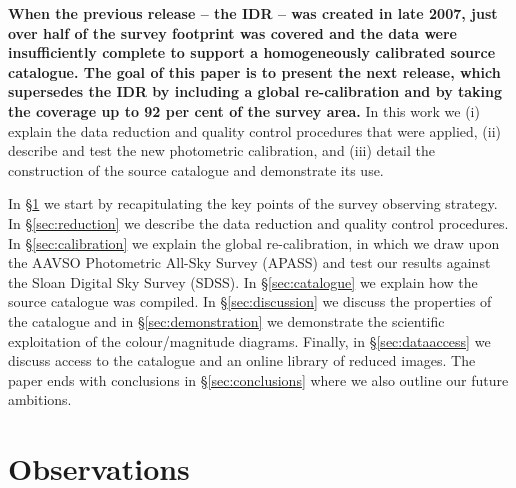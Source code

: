 \documentclass[a4paper,useAMS,usenatbib]{mn2e}
\begin{document}
{\bf When the previous release -- the IDR -- was created in late 2007,
just over half of the survey footprint was covered
and the data were insufficiently complete 
to support a homogeneously calibrated source catalogue.
The goal of this paper is to present the next release, 
 which supersedes the IDR by including a global re-calibration
and by taking the coverage up to 92 per cent of the survey area.}
In this work we
(i) explain the data reduction 
and quality control procedures that were applied,
(ii) describe and test the new photometric calibration, and 
(iii) detail the construction of the source catalogue
and demonstrate its use.

In \S\ref{sec:observations} we start by recapitulating the key points
of the survey observing strategy.
In \S\ref{sec:reduction} we describe the data reduction
and quality control procedures.
In \S\ref{sec:calibration} we explain the global re-calibration, in which
we draw upon the AAVSO Photometric All-Sky Survey (APASS)
and test our results against the Sloan Digital Sky Survey (SDSS).
In \S\ref{sec:catalogue} we explain how the source catalogue was compiled.
In \S\ref{sec:discussion} we discuss the properties of the catalogue
and in \S\ref{sec:demonstration} we demonstrate
the scientific exploitation of the colour/magnitude diagrams.
Finally, in \S\ref{sec:dataaccess} we discuss access
to the catalogue and an online library of reduced images.
The paper ends with conclusions in \S\ref{sec:conclusions} where we also outline
our future ambitions.

\section{Observations}
\label{sec:observations}
\end{document}
